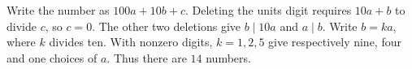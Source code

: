 Write the number as $100a+10b+c$. Deleting the units digit requires $10a+b$ to divide $c$, so $c=0$. The other two deletions give $b\mid10a$ and $a\mid b$. Write $b=ka$, where $k$ divides ten. With nonzero digits, $k=1,2,5$ give respectively nine, four and one choices of $a$. Thus there are $\boxed{14}$ numbers.
